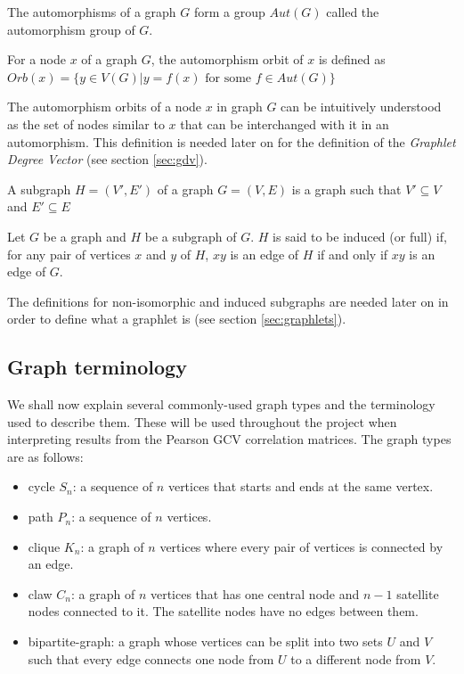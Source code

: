\begin{mydef}
The automorphisms of a graph $G$ form a group $Aut(G)$ called the automorphism group of $G$.
\end{mydef}

\begin{mydef}
\label{def:automorphism_orbit}
For a node $x$ of a graph $G$, the automorphism orbit of $x$ is defined as $Orb(x)=\{y \in V(G) | y = f(x) \text{ for some } f \in Aut(G)\}$
\end{mydef}

The automorphism orbits of a node $x$ in graph $G$ can be intuitively understood as the set of nodes similar to $x$ that can be interchanged with it in an automorphism. This definition is needed later on for the definition of the \emph{Graphlet Degree Vector} (see section \ref{sec:gdv}).


\begin{mydef}
 A subgraph $H=(V',E')$ of a graph $G=(V,E)$ is a graph such that $V' \subseteq V$ and $E' \subseteq E$
\end{mydef}

\begin{mydef}
\label{def:induced}
 Let $G$ be a graph and $H$ be a subgraph of $G$. $H$ is said to be induced (or full) if, for any pair of vertices $x$ and $y$ of $H$, $xy$ is an edge of $H$ if and only if $xy$ is an edge of $G$.
\end{mydef}

The definitions for non-isomorphic and induced subgraphs are needed later on in order to define what a graphlet is (see section \ref{sec:graphlets}). 

\subsection{Graph terminology}
\label{graph_terminology}

We shall now explain several commonly-used graph types and the terminology used to describe them. These will be used throughout the project when interpreting results from the Pearson GCV correlation matrices. The graph types are as follows:
\begin{itemize}
 \item cycle $S_n$: a sequence of $n$ vertices that starts and ends at the same vertex.
 \item path $P_n$: a sequence of $n$ vertices.
 \item clique $K_n$: a graph of $n$ vertices where every pair of vertices is connected by an edge.
 \item claw $C_n$: a graph of $n$ vertices that has one central node and $n-1$ satellite nodes connected to it. The satellite nodes have no edges between them.
 \item bipartite-graph: a graph whose vertices can be split into two sets $U$ and $V$ such that every edge connects one node from $U$ to a different node from $V$.
\end{itemize}

